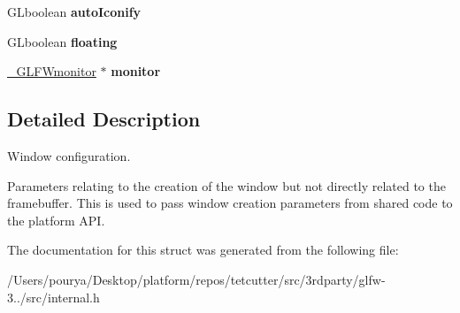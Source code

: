 \begin{DoxyCompactItemize}
\item 
\hypertarget{struct__GLFWwndconfig_a59fcec41f3da36d08f2948e020003607}{}G\+Lboolean {\bfseries auto\+Iconify}\label{struct__GLFWwndconfig_a59fcec41f3da36d08f2948e020003607}

\item 
\hypertarget{struct__GLFWwndconfig_a275386fb7932c5301a4a1de54a82d3b7}{}G\+Lboolean {\bfseries floating}\label{struct__GLFWwndconfig_a275386fb7932c5301a4a1de54a82d3b7}

\item 
\hypertarget{struct__GLFWwndconfig_a2c6ae93f3467f72a52fd104c1304e6b0}{}\hyperlink{struct__GLFWmonitor}{\+\_\+\+G\+L\+F\+Wmonitor} $\ast$ {\bfseries monitor}\label{struct__GLFWwndconfig_a2c6ae93f3467f72a52fd104c1304e6b0}

\end{DoxyCompactItemize}


\subsection{Detailed Description}
Window configuration. 

Parameters relating to the creation of the window but not directly related to the framebuffer. This is used to pass window creation parameters from shared code to the platform A\+P\+I. 

The documentation for this struct was generated from the following file\+:\begin{DoxyCompactItemize}
\item 
/\+Users/pourya/\+Desktop/platform/repos/tetcutter/src/3rdparty/glfw-\/3../src/internal.\+h\end{DoxyCompactItemize}

